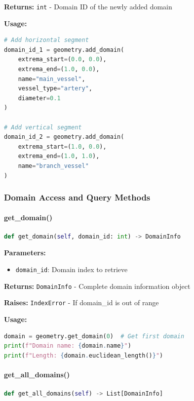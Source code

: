 \textbf{Returns:} \texttt{int} - Domain ID of the newly added domain

\textbf{Usage:}
\begin{lstlisting}[language=Python, caption=Adding Domains Example]
# Add horizontal segment
domain_id_1 = geometry.add_domain(
    extrema_start=(0.0, 0.0),
    extrema_end=(1.0, 0.0),
    name="main_vessel",
    vessel_type="artery",
    diameter=0.1
)

# Add vertical segment
domain_id_2 = geometry.add_domain(
    extrema_start=(1.0, 0.0),
    extrema_end=(1.0, 1.0),
    name="branch_vessel"
)
\end{lstlisting}

\subsubsection{Domain Access and Query Methods}

\paragraph{get\_domain()}\leavevmode
\begin{lstlisting}[language=Python, caption=Get Domain Method]
def get_domain(self, domain_id: int) -> DomainInfo
\end{lstlisting}

\textbf{Parameters:}
\begin{itemize}
    \item \texttt{domain\_id}: Domain index to retrieve
\end{itemize}

\textbf{Returns:} \texttt{DomainInfo} - Complete domain information object

\textbf{Raises:} \texttt{IndexError} - If domain\_id is out of range

\textbf{Usage:}
\begin{lstlisting}[language=Python]
domain = geometry.get_domain(0)  # Get first domain
print(f"Domain name: {domain.name}")
print(f"Length: {domain.euclidean_length()}")
\end{lstlisting}

\paragraph{get\_all\_domains()}\leavevmode
\begin{lstlisting}[language=Python, caption=Get All Domains Method]
def get_all_domains(self) -> List[DomainInfo]
\end{lstlisting}

